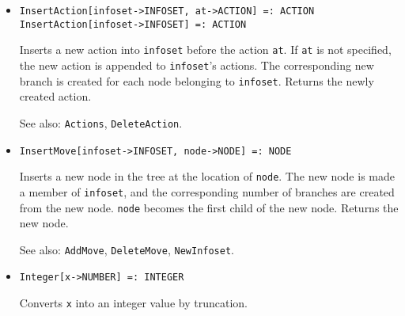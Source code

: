 \begin{itemize}


\item{}
\protect \large \begin{verbatim}
InsertAction[infoset->INFOSET, at->ACTION] =: ACTION 
InsertAction[infoset->INFOSET] =: ACTION 
\end{verbatim}\normalsize

\bd
Inserts a new action into \verb+infoset+ before the action \verb+at+.  
If \verb+at+ is not specified, the new action is appended to \verb+infoset+'s
actions.
The corresponding new branch is created for
each node belonging to \verb+infoset+.  Returns the newly created action.
\item
[See also:] \verb+Actions+, \verb+DeleteAction+.
\ed

\item{}
\protect \large \begin{verbatim}
InsertMove[infoset->INFOSET, node->NODE] =: NODE 
\end{verbatim}\normalsize

\bd
Inserts a new node in the tree at the location of \verb+node+.  The
new node is made a member of \verb+infoset+, and the
corresponding number of branches are created from the new node.  \verb+node+
becomes the first child of the new node.  Returns the new node.
\item [See also:] \verb+AddMove+, \verb+DeleteMove+, \verb+NewInfoset+.
\ed

\item{}
\protect \large \begin{verbatim}
Integer[x->NUMBER] =: INTEGER 
\end{verbatim} \normalsize

\bd
Converts \verb+x+ into an integer value by truncation.
\ed


\end{itemize}
